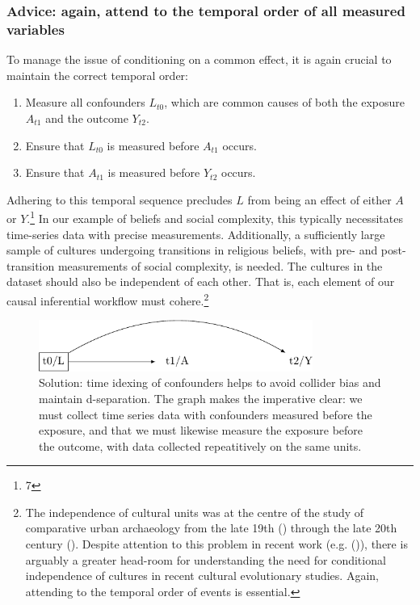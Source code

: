 \documentclass[
  singlecolumn,
  9pt]{article}
\providecommand{\tightlist}{%
  \setlength{\itemsep}{0pt}\setlength{\parskip}{0pt}}\usepackage{longtable,booktabs,array}
\begin{document}
\subsubsection{Advice: again, attend to the temporal order of all
measured
variables}\label{advice-again-attend-to-the-temporal-order-of-all-measured-variables}

To manage the issue of conditioning on a common effect, it is again
crucial to maintain the correct temporal order:

\begin{enumerate}
\def\labelenumi{\arabic{enumi}.}
\tightlist
\item
  Measure all confounders \(L_{t0}\), which are common causes of both
  the exposure \(A_{t1}\) and the outcome \(Y_{t2}\).
\item
  Ensure that \(L_{t0}\) is measured before \(A_{t1}\) occurs.
\item
  Ensure that \(A_{t1}\) is measured before \(Y_{t2}\) occurs.
\end{enumerate}

Adhering to this temporal sequence precludes \(L\) from being an effect
of either \(A\) or \(Y\).\footnote{7} In our example of beliefs and
social complexity, this typically necessitates time-series data with
precise measurements. Additionally, a sufficiently large sample of
cultures undergoing transitions in religious beliefs, with pre- and
post-transition measurements of social complexity, is needed. The
cultures in the dataset should also be independent of each other. That
is, each element of our causal inferential workflow must
cohere.\footnote{The independence of cultural units was at the centre of
  the study of comparative urban archaeology from the late 19th
  () through the late
  20th century (). Despite
  attention to this problem in recent work (e.g.
  ()), there is
  arguably a greater head-room for understanding the need for
  conditional independence of cultures in recent cultural evolutionary
  studies. Again, attending to the temporal order of events is
  essential.}

\begin{figure}

{\centering \includegraphics[width=0.8\textwidth,height=\textheight]{causal-dags_files/figure-pdf/fig-dag-common-effect-solution-1.pdf}

}

\caption{\label{fig-dag-common-effect-solution}Solution: time idexing of
confounders helps to avoid collider bias and maintain d-separation. The
graph makes the imperative clear: we must collect time series data with
confounders measured before the exposure, and that we must likewise
measure the exposure before the outcome, with data collected
repeatitively on the same units.}

\end{figure}
\end{document}
